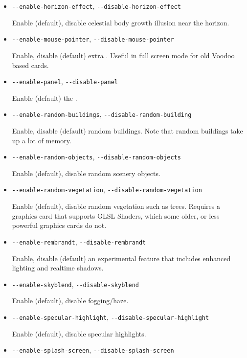 \begin{itemize}
{\begin{itemize}
  \item{\texttt{-$ $-enable-horizon-effect}, \texttt{-$ $-disable-horizon-effect}}

  Enable (default), disable celestial body growth illusion near the horizon.

  \item{\texttt{-$ $-enable-mouse-pointer}, \texttt{-$ $-disable-mouse-pointer}}

  Enable, disable (default) extra . Useful in full screen mode for old Voodoo based cards.

  \item{\texttt{-$ $-enable-panel}, \texttt{-$ $-disable-panel}}

  Enable (default) the .

  \item{\texttt{-$ $-enable-random-buildings}, \texttt{-$ $-disable-random-building}}

  Enable, disable (default) random buildings. Note that random buildings take up a lot of memory.

  \item{\texttt{-$ $-enable-random-objects}, \texttt{-$ $-disable-random-objects}}

  Enable (default), disable random scenery objects.

  \item{\texttt{-$ $-enable-random-vegetation}, \texttt{-$ $-disable-random-vegetation}}

  Enable (default), disable random vegetation such as trees. Requires a graphics card that
  supports GLSL Shaders, which some older, or less powerful graphics cards do not.

  \item{\texttt{-$ $-enable-rembrandt}, \texttt{-$ $-disable-rembrandt}}

  Enable, disable (default) an experimental feature that includes
   enhanced lighting and realtime shadows.

  \item{\texttt{-$ $-enable-skyblend}, \texttt{-$ $-disable-skyblend}}

  Enable (default), disable fogging/haze.

  \item{\texttt{-$ $-enable-specular-highlight}, \texttt{-$ $-disable-specular-highlight}}

  Enable (default), disable specular highlights.

  \item{\texttt{-$ $-enable-splash-screen}, \texttt{-$ $-disable-splash-screen}}


\end{itemize}}
\end{itemize}
